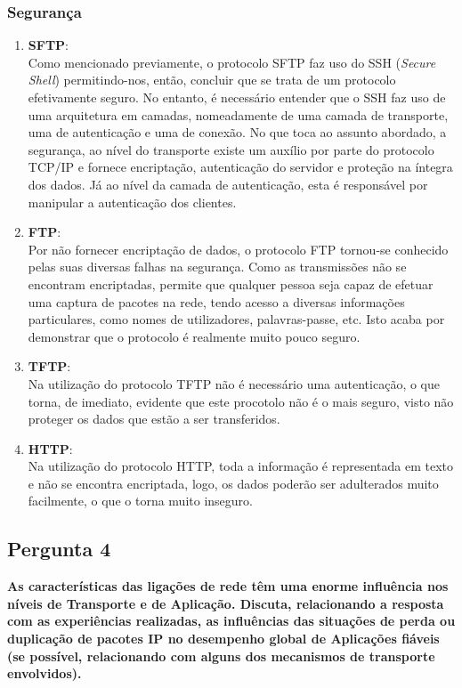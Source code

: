 \documentclass[11pt]{article}
\begin{document}
\subsubsection{Segurança}
\begin{enumerate}
  \item \textbf{SFTP}:\\
  Como mencionado previamente, o protocolo SFTP faz uso do SSH (\textit{Secure Shell}) permitindo-nos, então, concluir que se trata de um protocolo efetivamente seguro. No entanto, é necessário entender que o SSH faz uso de uma arquitetura em camadas, nomeadamente de uma camada de transporte, uma de autenticação e uma de conexão. No que toca ao assunto abordado, a segurança, ao nível do transporte existe um auxílio por parte do protocolo TCP/IP e fornece encriptação, autenticação do servidor e proteção na íntegra dos dados. Já ao nível da camada de autenticação, esta é responsável por manipular a autenticação dos clientes.
  \item \textbf{FTP}:\\
  Por não fornecer encriptação de dados, o protocolo FTP tornou-se conhecido pelas suas diversas falhas na segurança. Como as transmissões não se encontram encriptadas, permite que qualquer pessoa seja capaz de efetuar uma captura de pacotes na rede, tendo acesso a diversas informações particulares, como nomes de utilizadores, palavras-passe, etc. Isto acaba por demonstrar que o protocolo é realmente muito pouco seguro.
  \item \textbf{TFTP}:\\
  Na utilização do protocolo TFTP não é necessário uma autenticação, o que torna, de imediato, evidente que este procotolo não é o mais seguro, visto não proteger os dados que estão a ser transferidos.
\clearpage
  \item \textbf{HTTP}:\\
  Na utilização do protocolo HTTP, toda a informação é representada em texto e não se encontra encriptada, logo, os dados poderão ser adulterados muito facilmente, o que o torna muito inseguro.
\end{enumerate}


\vspace{0.5cm}
\subsection{Pergunta 4}

\textbf{As características das ligações de rede têm uma enorme influência nos níveis de Transporte e de Aplicação. Discuta, relacionando a resposta com as experiências realizadas, as influências das situações de perda ou duplicação de pacotes IP no desempenho global de Aplicações fiáveis (se possível, relacionando com alguns dos mecanismos de transporte envolvidos).}
\end{document}
